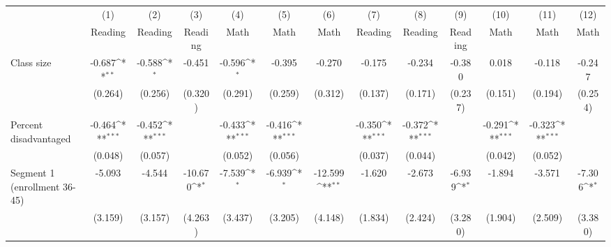 {
\def\sym#1{\ifmmode^{#1}\else\(^{#1}\)\fi}
\begin{tabular}{l*{12}{c}}
\toprule
            &\multicolumn{1}{c}{(1)}&\multicolumn{1}{c}{(2)}&\multicolumn{1}{c}{(3)}&\multicolumn{1}{c}{(4)}&\multicolumn{1}{c}{(5)}&\multicolumn{1}{c}{(6)}&\multicolumn{1}{c}{(7)}&\multicolumn{1}{c}{(8)}&\multicolumn{1}{c}{(9)}&\multicolumn{1}{c}{(10)}&\multicolumn{1}{c}{(11)}&\multicolumn{1}{c}{(12)}\\
            &\multicolumn{1}{c}{Reading}&\multicolumn{1}{c}{Reading}&\multicolumn{1}{c}{Reading}&\multicolumn{1}{c}{Math}&\multicolumn{1}{c}{Math}&\multicolumn{1}{c}{Math}&\multicolumn{1}{c}{Reading}&\multicolumn{1}{c}{Reading}&\multicolumn{1}{c}{Reading}&\multicolumn{1}{c}{Math}&\multicolumn{1}{c}{Math}&\multicolumn{1}{c}{Math}\\
\midrule
Class size  &      -0.687\sym{**} &      -0.588\sym{*}  &      -0.451         &      -0.596\sym{*}  &      -0.395         &      -0.270         &      -0.175         &      -0.234         &      -0.380         &       0.018         &      -0.118         &      -0.247         \\
            &     (0.264)         &     (0.256)         &     (0.320)         &     (0.291)         &     (0.259)         &     (0.312)         &     (0.137)         &     (0.171)         &     (0.237)         &     (0.151)         &     (0.194)         &     (0.254)         \\
\addlinespace
Percent disadvantaged&      -0.464\sym{***}&      -0.452\sym{***}&                     &      -0.433\sym{***}&      -0.416\sym{***}&                     &      -0.350\sym{***}&      -0.372\sym{***}&                     &      -0.291\sym{***}&      -0.323\sym{***}&                     \\
            &     (0.048)         &     (0.057)         &                     &     (0.052)         &     (0.056)         &                     &     (0.037)         &     (0.044)         &                     &     (0.042)         &     (0.052)         &                     \\
\addlinespace
Segment 1 (enrollment 36-45)&      -5.093         &      -4.544         &     -10.670\sym{*}  &      -7.539\sym{*}  &      -6.939\sym{*}  &     -12.599\sym{**} &      -1.620         &      -2.673         &      -6.939\sym{*}  &      -1.894         &      -3.571         &      -7.306\sym{*}  \\
            &     (3.159)         &     (3.157)         &     (4.263)         &     (3.437)         &     (3.205)         &     (4.148)         &     (1.834)         &     (2.424)         &     (3.280)         &     (1.904)         &     (2.509)         &     (3.380)         \\

\end{tabular}}
